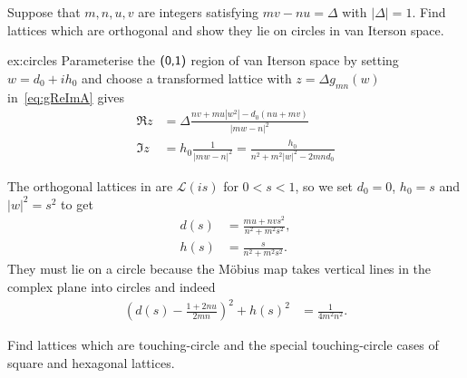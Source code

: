 \begin{jExercise}\label{ex:circles}
	Suppose that $m ,n ,u, v$ are integers satisfying  $m v - n u =\Delta $ with $|\Delta|=1$.  Find   lattices which are  orthogonal and show they lie on circles in van Iterson space.
\end{jExercise}
\begin{jAnswer}{ex:circles}
	Parameterise the  $\textsf{(0,1)}$ region of van Iterson space by setting $w=d_0+ih_0$ and choose a transformed lattice with $z=\Delta g_{mn}(w)$ in~\eqref{eq:gReImA} gives
	\begin{align}
		\Re z &= 
		\Delta \frac{n v + m u| w^2|	- d_0( n u + m v)}{|m w-n|^2} 
		\label{eq:rez}
		\\
		\Im z &=	h_0 
		\frac{ 1}{|m w-n|^2} =  
		\frac{ h_0}{n^2 + m^2 |w|^2 - 2 m n d_0}
		\label{eq:gReIBm}
	\end{align}
	
	The orthogonal lattices in  are $\mathcal{L}(is)$ for $0<s<1$, so we set $d_0=0$, $h_0=s$ and $|w|^2=s^2$ to get 
	\begin{align}
		d(s) &= \frac{ m u +  n v s^2  }{n^2 +m^2 s^2 },
		\\
		h(s)  &= \frac{s}{n^2 +m^2 s^2  }.
	\end{align}
	They must lie on a circle because the M\"obius map takes vertical lines in the complex plane into circles and indeed
	\begin{align}
		\left( d(s)- \frac{1+2nu}{2mn}\right)^2 + h(s)^2 &= \frac{1}{4 m^2 n^2}.
	\end{align}
	
\end{jAnswer}

\begin{jExercise}\label{ex:shcircles}
	Find   lattices which are touching-circle and the special touching-circle cases of square and hexagonal lattices. 
	\label{ex:orthogonal}
\end{jExercise}

